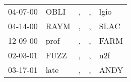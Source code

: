 \begin{supertabular}{lllll}
 04-07-00 &  OBLI &  , &  , &  lgio \\
 04-14-00 &  RAYM &  , &  , &  SLAC \\
 12-09-00 &  prof &  , &  , &  FARM \\
 02-03-01 &  FUZZ &  , &  , &   n2f \\
 03-17-01 &  late &  , &  , &  ANDY \\
\end{supertabular}
